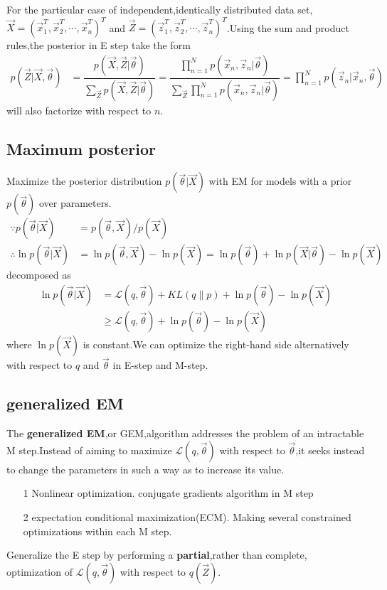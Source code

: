 For the particular case of independent,identically distributed data set,$\vec{X}=(\vec{x}_1^T,\vec{x}_2^T,\cdots,\vec{x}_n^T)^T$ and $\vec{Z}=(\vec{z}_1^T,\vec{z}_2^T,\cdots,\vec{z}_n^T)^T$.Using the sum and product rules,the posterior in E step take the form
\begin{align}
p(\vec{Z}|\vec{X},\vec{\theta}) &= \dfrac{p(\vec{X},\vec{Z}|\vec{\theta})}{\sum_{\vec{Z}}p(\vec{X},\vec{Z}|\vec{\theta})}
=\dfrac{\prod_{n=1}^{N}p(\vec{x}_n,\vec{z}_n|\vec{\theta})}{\sum_{\vec{Z}}\prod_{n=1}^{N}p(\vec{x}_n,\vec{z}_n|\vec{\theta})}
=\prod_{n=1}^{N}p(\vec{z}_n|\vec{x}_n,\vec{\theta})
\end{align}
will also factorize with respect to $n$.

\subsection{Maximum posterior}
Maximize the posterior distribution $p(\vec{\theta}|\vec{X})$ with EM for models with a prior $p(\vec{\theta})$ over parameters.
\begin{align}
\because p(\vec{\theta}|\vec{X})&=p(\vec{\theta},\vec{X})/p(\vec{X}) \\
\therefore \ln p(\vec{\theta}|\vec{X})&=\ln p(\vec{\theta},\vec{X})-\ln p(\vec{X})
	=\ln p(\vec{\theta})+\ln p(\vec{X}|\vec{\theta})-\ln p(\vec{X})
\end{align}
decomposed as
\begin{align}
\ln p(\vec{\theta}|\vec{X}) &= \mathcal{L}(q,\vec{\theta})+KL(q\parallel p) +\ln p(\vec{\theta}) -\ln p(\vec{X})\\
&\geq \mathcal{L}(q,\vec{\theta}) +\ln p(\vec{\theta}) -\ln p(\vec{X})
\end{align}
where $\ln p(\vec{X})$ is constant.We can optimize the right-hand side alternatively with respect to $q$ and $\vec{\theta}$ in E-step and M-step.

\subsection{generalized EM}
The \textbf{generalized EM},or GEM,algorithm addresses the problem of an intractable M step.Instead of aiming to maximize $\mathcal{L}(q,\vec{\theta})$ with respect to $\vec{\theta}$,it seeks instead to change the parameters in such a way as to increase its value.
\begin{itemize}
	\item[1]Nonlinear optimization. conjugate gradients algorithm in M step
	\item[2]expectation conditional maximization(ECM). Making several constrained optimizations within each M step.
\end{itemize}

Generalize the E step by performing a \textbf{partial},rather than complete, optimization of $\mathcal{L}(q,\vec{\theta})$ with respect to $q(\vec{Z})$.





